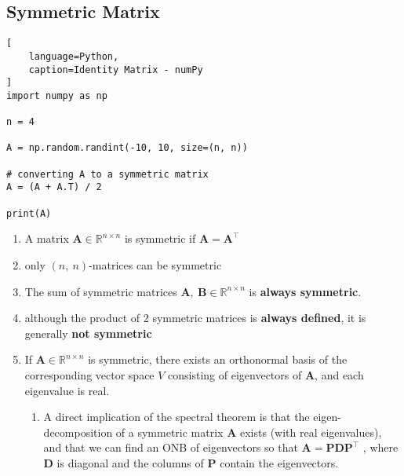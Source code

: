 \subsection{Symmetric Matrix}

\begin{lstlisting}[
    language=Python,
    caption=Identity Matrix - numPy
]
import numpy as np

n = 4

A = np.random.randint(-10, 10, size=(n, n))

# converting A to a symmetric matrix
A = (A + A.T) / 2

print(A)
\end{lstlisting}

\begin{enumerate}
    \item A matrix $\bm{A} \in \mathbb{R}^{n\times n}$ is symmetric if $\bm{A} = \bm{A}^\top$
    \hfill \cite{mfml/book/mml/Deisenroth-Faisal-Ong}
    
    \item only $(n,\ n)$-matrices can be symmetric
    \hfill \cite{mfml/book/mml/Deisenroth-Faisal-Ong}

    \item The sum of symmetric matrices $\bm{A},\ \bm{B} \in \mathbb{R}^{n\times n}$ is \textbf{always symmetric}. 
    \hfill \cite{mfml/book/mml/Deisenroth-Faisal-Ong}

    \item although the product of 2 symmetric matrices is \textbf{always defined}, it is generally \textbf{not symmetric}
    \hfill \cite{mfml/book/mml/Deisenroth-Faisal-Ong}

    \item 
    \begin{theorem}
        If $\bm{A} \in \mathbb{R}^{n\times n}$ is symmetric, there exists an orthonormal basis of the corresponding vector space $V$ consisting of eigenvectors of $\bm{A}$, and each eigenvalue is real.
        \hfill \cite{mfml/book/mml/Deisenroth-Faisal-Ong}
    \end{theorem}
    \begin{enumerate}
        \item A direct implication of the spectral theorem is that the eigen-decomposition of a symmetric matrix $\bm{A}$ exists (with real eigenvalues), and that we can find an ONB of eigenvectors so that $\bm{A} = \bm{PDP}^\top$ , where $\bm{D}$ is diagonal and the columns of $\bm{P}$ contain the eigenvectors.
        \hfill \cite{mfml/book/mml/Deisenroth-Faisal-Ong}
    \end{enumerate}


\end{enumerate}
